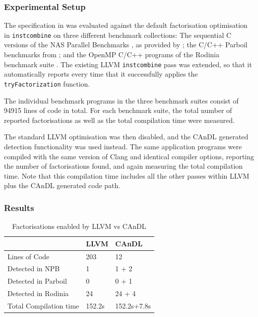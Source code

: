 \subsubsection{Experimental Setup}

    The specification in  was evaluated against the default
    factorisation optimisation in \texttt{instcombine} on three different
    benchmark collections:
    The sequential C versions of the NAS Parallel Benchmarks
    \citep{Bailey1991NPB}, as provided by \citet{seo2011performance};
    the C/C++ Parboil benchmarks from \citet{stratton2012parboil};
    and the OpenMP C/C++ programs of the Rodinia benchmark suite
    \citep{Che2009Rodinia}.
    The existing LLVM \texttt{instcombine} pass was extended, so that it
    automatically reports every time that it successfully applies the
    \texttt{tryFactorization} function.  

    The individual benchmark programs in the three benchmark
    suites consist of 94915 lines of code in total.
    For each benchmark suite, the total number of reported factorisations as
    well as the total compilation time were measured.

    The standard LLVM optimisation was then disabled, and the CAnDL generated
    detection functionality was used instead.
    The same application programs were compiled with the same version of Clang
    and identical compiler options, reporting the number of factorisations
    found, and again measuring the total compilation time.
    Note that this compilation time includes all the other passes within LLVM
    plus the CAnDL generated code path.

\subsubsection{Results}

\begin{table}[t]
\centering
\begin{tabular}{|l||l|l|}
\hline
         & LLVM  &CAnDL \\
\hline
\hline
Lines of Code & 203 & 12 \\
\hline
Detected in NPB & 1 & 1 + 2 \\
Detected in Parboil & 0 & 0 + 1\\
Detected in Rodinia & 24 & 24 + 4\\
\hline
Total Compilation time & 152.2s & 152.2s+7.8s \\
\hline
\end{tabular}
\caption{Factorisations enabled by LLVM vs CAnDL}
\label{fig:factorization_results}
\end{table}

